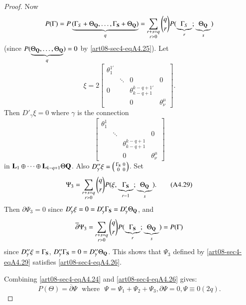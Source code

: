 \begin{proof}
Now\pageoriginale 
$$
P(\Gamma)=P\underbrace{(\Gamma_{S}+\Theta_{\mathbf{Q}},\ldots,\Gamma_{\mathbf{S}}+\Theta_{\mathbf{Q}})}_{q}=\sum\limits_{\substack{r+s=q\\ r>0}}\binom{q}{r}P(\underbrace{\Gamma_{S}}_{r};\underbrace{\Theta_{\mathbf{Q}}}_{s})
$$ 
(since $P(\underbrace{\Theta_{\mathbf{Q}},\ldots,\Theta_{\mathbf{Q}}}_{q})=0$ by \eqref{art08-sec4-eqA4.25}). 
Let 
$$
\xi=2\left[\begin{array}{llll} \theta^{1'}_{1} & &\\
 & \ddots & 0 & 0\\
0 & &\theta^{k-q+1'}_{k-q+1} &\\
 & & 0 & \theta^{\mu}_{\nu}
 \end{array}\right].
$$
Then $D'_{\gamma}\xi=0$ where $\gamma$ is the connection
$$
\left[\begin{array}{llll} \theta^{1}_{1} & &\\
 & \ddots &  & 0\\
 & &\theta^{k-q+1}_{k-q+1} &\\
 & & 0 & \theta^{\mu}_{\nu}
 \end{array}\right]
$$
in $\mathbf{L}_{1}\oplus\cdots\oplus \mathbf{L}_{k-q+1}\Theta\mathbf{Q}$. Also $D''_{\gamma}\xi=\left(\begin{smallmatrix} \Gamma_{\mathbf{S}} & 0\\ 0 & 0\end{smallmatrix}\right)$. Set
\begin{equation*}
\Psi_{3}=\sum\limits_{\substack{r+s=q\\ r>0}}\binom{q}{r}P(\xi,\underbrace{\Gamma_{\mathbf{S}}}_{r-1};\underbrace{\Theta_{\mathbf{Q}}}_{s}).\tag{A4.29}\label{art08-sec4-eqA4.29}
\end{equation*}
Then $\partial \Psi_{3}=0$ since $D'_{\gamma}\xi=0=D'_{\gamma}\Gamma_{\mathbf{S}}=D'_{\gamma}\Theta_{\mathbf{Q}}$, and 
$$
\overline{\partial}\Psi_{3}=\sum\limits_{\substack{r+s=q\\ r>0}}\binom{q}{r}P(\underbrace{\Gamma_{\mathbf{S}}}_{r};\underbrace{\Theta_{\mathbf{Q}}}_{s})=P(\Gamma)
$$ 
since $D''_{\gamma}\xi=\Gamma_{\mathbf{S}}$, $D''_{\gamma}\Gamma_{\mathbf{S}}=0=D''_{\gamma}\Theta_{\mathbf{Q}}$.
This shows that $\Psi_{3}$ defined by \eqref{art08-sec4-eqA4.29} satisfies \eqref{art08-sec4-eqA4.26}.

Combining \eqref{art08-sec4-eqA4.24} and \eqref{art08-sec4-eqA4.26} gives:
\begin{equation*}
P(\Theta)=\overline{\partial}\Psi \text{~ where~ } \Psi=\Psi_{1}+\Psi_{2}+\Psi_{3},\partial \Psi=0,\Psi\equiv 0(2q).\tag{A4.30}\label{art08-sec4-eqA4.30}
\end{equation*}


\end{proof}
